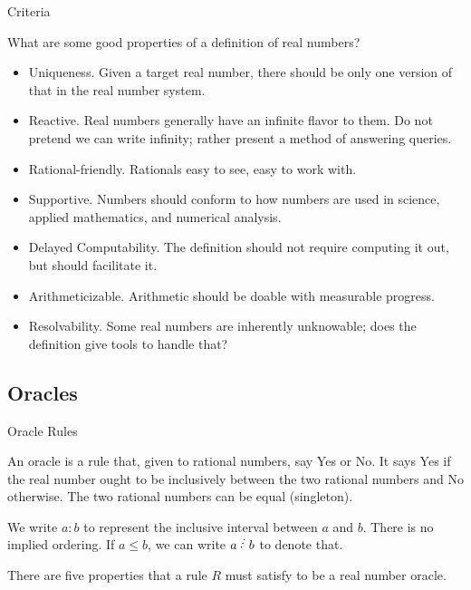 \documentclass{beamer}
\begin{document}
\begin{frame}{Criteria}
    

What are some good properties of a definition of real numbers? 

\begin{itemize}
    \item Uniqueness. Given a target real number, there should be only one version of that in the real number system.
    \item Reactive. Real numbers generally have an infinite flavor to them. Do not pretend we can write infinity; rather present a method of answering queries. 
    \item Rational-friendly. Rationals easy to see, easy to work with. 
    \item Supportive. Numbers should conform to how numbers are used in science, applied mathematics, and numerical analysis. 
    \item Delayed Computability. The definition should not require computing it out, but should facilitate it. 
    \item Arithmeticizable. Arithmetic should be doable with measurable progress. 
    \item Resolvability. Some real numbers are inherently unknowable; does the definition give tools to handle that? 
\end{itemize}

\end{frame}

\subsection{Oracles}

\begin{frame}{Oracle Rules}

    An oracle is a rule that, given to rational numbers, say Yes or No. It says Yes if the real number ought to be inclusively between the two rational numbers and No otherwise. The two rational numbers can be equal (singleton). 

    We write $a:b$ to represent the inclusive interval between $a$ and $b$. There is no implied ordering. If $a \leq b$, we can write $a \lte b$ to denote that. 

    There are five properties that a rule $R$ must satisfy to be a real number oracle. 

\end{frame}
\end{document}
